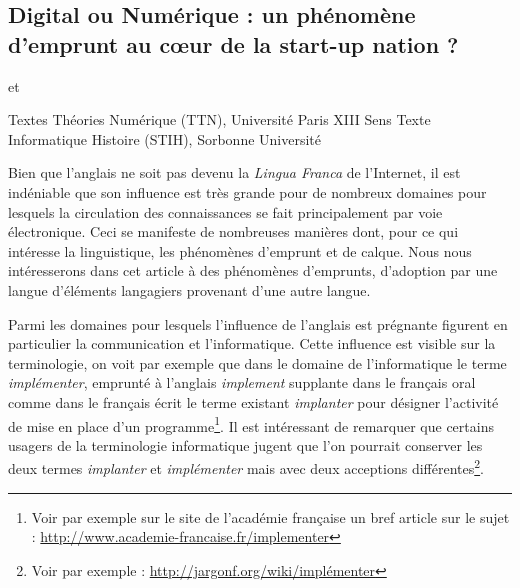 \begin{center}
\section*{Digital ou Numérique : un phénomène d'emprunt au c\oe ur de la start-up nation ?} 
  et
 

{\small {} Textes Théories Numérique (TTN), Université Paris XIII}
{\small {} Sens Texte Informatique Histoire (STIH), Sorbonne Université}

\end{center}


 Bien que l'anglais ne soit pas devenu la \textit{Lingua Franca} de l'Internet,  il est indéniable que son influence est très grande pour de nombreux domaines pour lesquels la circulation des connaissances se fait principalement par voie électronique\cite{Crystal-2002}. 
  Ceci se manifeste de nombreuses manières dont, pour ce qui intéresse la linguistique, les phénomènes d'emprunt et de calque.
   Nous nous intéresserons dans cet article à des phénomènes d'emprunts, d'adoption par une langue d'éléments langagiers provenant d'une autre langue. 
  
 Parmi les domaines pour lesquels l'influence de l'anglais est prégnante figurent en particulier la communication et l'informatique.
 Cette influence est visible sur la terminologie, on voit par exemple que dans le domaine de l'informatique le terme \textit{implémenter}, emprunté à l'anglais \textit{implement} supplante dans le français oral comme dans le français écrit le terme existant \textit{implanter} pour désigner l'activité de mise en place d'un programme\footnote{Voir par exemple sur le site de l'académie française un bref article sur le sujet : \url{http://www.academie-francaise.fr/implementer}}.
 Il est intéressant de remarquer que certains usagers de la terminologie informatique jugent que l'on pourrait conserver les deux termes \textit{implanter} et \textit{implémenter} mais avec deux acceptions différentes\footnote{Voir par exemple : \url{http://jargonf.org/wiki/implémenter}}.
  
